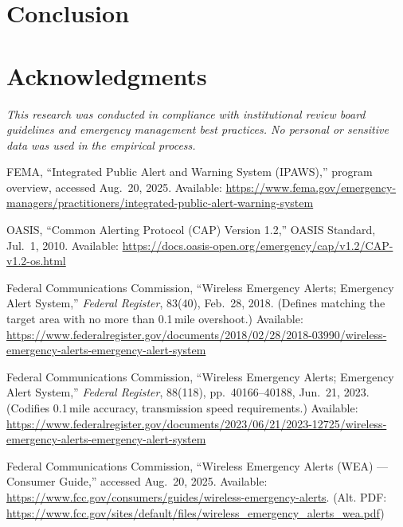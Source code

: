 \documentclass[11pt,twocolumn]{article}
\begin{document}
\section{Conclusion}

\section*{Acknowledgments}

\textit{This research was conducted in compliance with institutional review board guidelines and emergency management best practices. No personal or sensitive data was used in the empirical process.}

\begin{thebibliography}{99}

FEMA, ``Integrated Public Alert and Warning System (IPAWS),'' program overview, accessed Aug.\ 20, 2025. Available: \url{https://www.fema.gov/emergency-managers/practitioners/integrated-public-alert-warning-system}

OASIS, ``Common Alerting Protocol (CAP) Version 1.2,'' OASIS Standard, Jul.\ 1, 2010. Available: \url{https://docs.oasis-open.org/emergency/cap/v1.2/CAP-v1.2-os.html}

Federal Communications Commission, ``Wireless Emergency Alerts; Emergency Alert System,'' \emph{Federal Register}, 83(40), Feb.\ 28, 2018. (Defines matching the target area with no more than 0.1\,mile overshoot.) Available: \url{https://www.federalregister.gov/documents/2018/02/28/2018-03990/wireless-emergency-alerts-emergency-alert-system}

Federal Communications Commission, ``Wireless Emergency Alerts; Emergency Alert System,'' \emph{Federal Register}, 88(118), pp.\ 40166--40188, Jun.\ 21, 2023. (Codifies 0.1\,mile accuracy, transmission speed requirements.) Available: \url{https://www.federalregister.gov/documents/2023/06/21/2023-12725/wireless-emergency-alerts-emergency-alert-system}

Federal Communications Commission, ``Wireless Emergency Alerts (WEA) — Consumer Guide,'' accessed Aug.\ 20, 2025. Available: \url{https://www.fcc.gov/consumers/guides/wireless-emergency-alerts}. (Alt. PDF: \url{https://www.fcc.gov/sites/default/files/wireless_emergency_alerts_wea.pdf})


\end{thebibliography}
\end{document}
